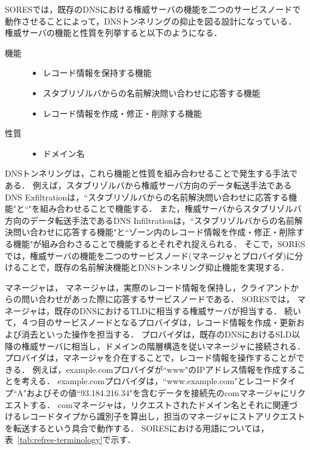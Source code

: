 SORESでは，既存のDNSにおける権威サーバの機能を二つのサービスノードで動作させることによって，DNSトンネリングの抑止を図る設計になっている．
権威サーバの機能と性質を列挙すると以下のようになる．
\begin{description}
 \item[機能]\mbox{}
  \begin{itemize}
   \item レコード情報を保持する機能
   \item スタブリゾルバからの名前解決問い合わせに応答する機能
   \item レコード情報を作成・修正・削除する機能
 \end{itemize}
 \item[性質]\mbox{}
 \begin{itemize}
  \item ドメイン名
 \end{itemize}
\end{description}
DNSトンネリングは，これら機能と性質を組み合わせることで発生する手法である．
例えば，スタブリゾルバから権威サーバ方向のデータ転送手法であるDNS Exfiltrationは，``スタブリゾルバからの名前解決問い合わせに応答する機能"と``"を組み合わせることで機能する．
また，権威サーバからスタブリゾルバ方向のデータ転送手法であるDNS Infiltrationは，``スタブリゾルバからの名前解決問い合わせに応答する機能"と``ゾーン内のレコード情報を作成・修正・削除する機能"が組み合わさることで機能するとそれぞれ捉えられる．
そこで，SORESでは，権威サーバの機能を二つのサービスノード(マネージャとプロバイダ)に分けることで，既存の名前解決機能とDNSトンネリング抑止機能を実現する．

マネージャは，
マネージャは，実際のレコード情報を保持し，クライアントからの問い合わせがあった際に応答するサービスノードである．
SORESでは，
マネージャは，既存のDNSにおけるTLDに相当する権威サーバが担当する．
続いて，４つ目のサービスノードとなるプロバイダは，レコード情報を作成・更新および消去といった操作を担当する．
プロバイダは，既存のDNSにおけるSLD以降の権威サーバに相当し，ドメインの階層構造を従いマネージャに接続される．
プロバイダは，マネージャを介在することで，レコード情報を操作することができる．
例えば，example.comプロバイダが``www"のIPアドレス情報を作成することを考える．
example.comプロバイダは，``www.example.com"とレコードタイプ``A"およびその値``93.184.216.34"を含むデータを接続先のcomマネージャにリクエストする．
comマネージャは，リクエストされたドメイン名とそれに関連づけるレコードタイプから識別子を算出し，担当のマネージャにストアリクエストを転送するという具合で動作する．
SORESにおける用語については，表~\ref{tab:refres-terminology}で示す．


